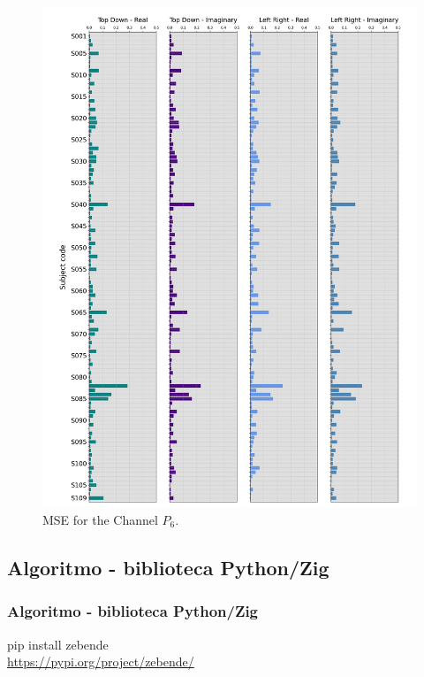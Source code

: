 \documentclass[11pt, aspectratio=169]{beamer}
\begin{document}
\begin{frame}
\begin{figure}[ht]
\begin{minipage}[b]{0.21\linewidth}
      \includegraphics[height=.5\paperheight]{../Figures/art_02/Fig13.jpg}
      \caption{MSE for the Channel $P_{6}$.}
      \label{fig24}
    \end{minipage}

  \end{figure}
\end{frame}


\subsection{Algoritmo - biblioteca Python/Zig}

\begin{frame}
  \frametitle{Algoritmo - biblioteca Python/Zig}
  \begin{center}
    pip install zebende \\
    \url{https://pypi.org/project/zebende/}
  \end{center}

\end{frame}
\end{document}
